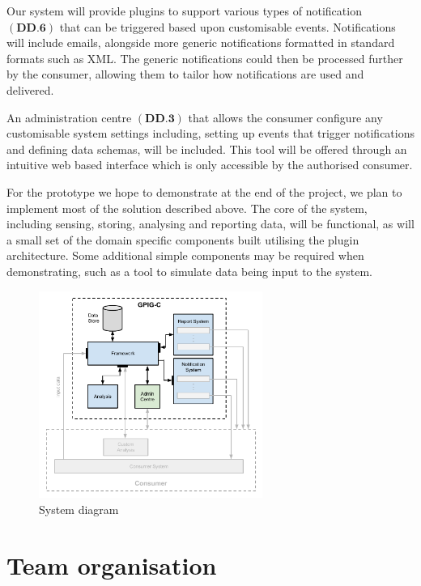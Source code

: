 \documentclass[10pt,a4paper]{article}
\begin{document}
Our system will provide plugins to support various types of notification 
$(\textbf{DD.6})$ that can be triggered based upon customisable events. 
 Notifications will include emails, alongside more generic notifications formatted 
 in standard formats such as XML. The generic notifications 
 could then be processed further by the consumer, allowing them to tailor how 
 notifications are used and delivered. 

An administration centre $(\textbf{DD.3})$ that allows
the consumer configure any customisable system settings including, setting up
events that trigger notifications and defining data schemas, will be included. This tool 
will be offered through an intuitive web based interface which is only accessible by the
authorised consumer. 

For the prototype we hope to demonstrate at the end of the project, we plan to
implement most of the solution described above. The core of the system,
including sensing, storing, analysing and reporting data, will be functional,
as will a small set of the domain specific components built utilising the plugin 
architecture. Some additional simple components may be required when 
demonstrating, such as a tool to simulate data being input to the system. 



\begin{figure}[hptb]
	\centering
	\includegraphics[width=0.65\textwidth]{system-architecture.pdf}
	\caption{System diagram}
	\label{fig:systemDiagram}
\end{figure}


\section{Team organisation}
\end{document}
